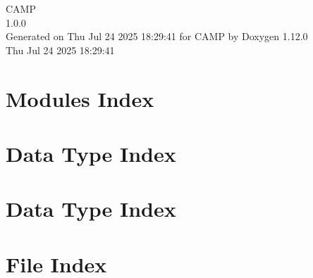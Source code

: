 \documentclass[twoside]{book}
\newcommand{\+}{\discretionary{\mbox{\scriptsize$\hookleftarrow$}}{}{}}
\newcommand{\clearemptydoublepage}{%
    \newpage{\pagestyle{empty}\cleardoublepage}%
  }
\begin{document}
  \raggedbottom
    \hypersetup{pageanchor=false,
                bookmarksnumbered=true,
                pdfencoding=unicode
               }
  \begin{titlepage}
  \vspace*{7cm}
  \begin{center}%
  {\Large CAMP}\\
  [1ex]\large 1.\+0.\+0 \\
  \vspace*{1cm}
  {\large Generated on Thu Jul 24 2025 18\+:29\+:41 for CAMP by Doxygen 1.12.0}\\
    \vspace*{0.5cm}
    {\small Thu Jul 24 2025 18:29:41}
  \end{center}
  \end{titlepage}
  \clearemptydoublepage
  \tableofcontents
  \clearemptydoublepage
  \hypersetup{pageanchor=true}















\chapter{Modules Index}

\chapter{Data Type Index}

\chapter{Data Type Index}

\chapter{File Index}

\end{document}

